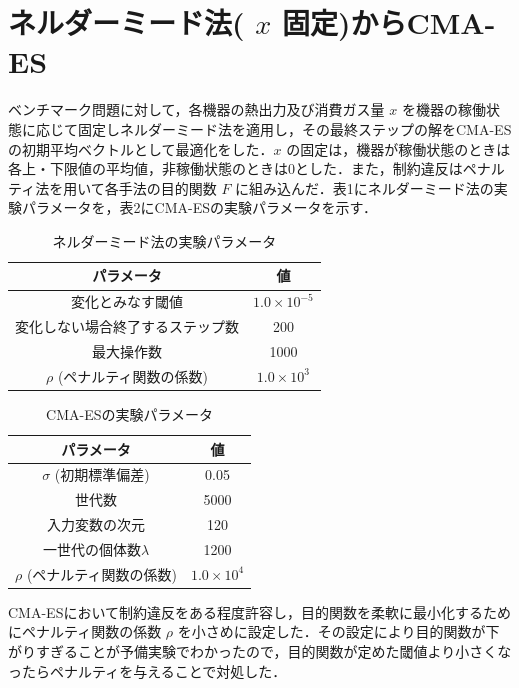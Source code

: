 \documentclass[twocolumn]{jarticle}
\begin{document}
\section{ネルダーミード法( $x$ 固定)からCMA-ES}
    ベンチマーク問題に対して，各機器の熱出力及び消費ガス量 $x$ を機器の稼働状態に応じて固定しネルダーミード法を適用し，その最終ステップの解をCMA-ESの初期平均ベクトルとして最適化をした．$x$ の固定は，機器が稼働状態のときは各上・下限値の平均値，非稼働状態のときは0とした．また，制約違反はペナルティ法を用いて各手法の目的関数 $F$ に組み込んだ．表1にネルダーミード法の実験パラメータを，表2にCMA-ESの実験パラメータを示す．
    \begin{table}[htbp]	%
        \begin{center}
            \caption{ネルダーミード法の実験パラメータ}
            \begin{tabular}{| c | c |} \hline
                パラメータ & 値 \\ \hline
                変化とみなす閾値 & $1.0\times10^{-5}$ \\ 
                変化しない場合終了するステップ数 & 200 \\
                最大操作数 & 1000 \\
                $\rho$ (ペナルティ関数の係数) & $1.0\times10^{3}$\\ \hline
            \end{tabular}
        \end{center}
    \end{table}
    \begin{table}[htbp] %
        \begin{center}
            \caption{CMA-ESの実験パラメータ}
            \begin{tabular}{| c | c |} \hline
                パラメータ & 値 \\ \hline
                $\sigma$ (初期標準偏差) & 0.05 \\
                世代数 & 5000 \\
                入力変数の次元 & 120 \\
                一世代の個体数$\lambda$ & 1200 \\
                $\rho$ (ペナルティ関数の係数) & $1.0\times10^{4}$\\ \hline
            \end{tabular}
        \end{center}
    \end{table}
    CMA-ESにおいて制約違反をある程度許容し，目的関数を柔軟に最小化するためにペナルティ関数の係数 $\rho$ を小さめに設定した．その設定により目的関数が下がりすぎることが予備実験でわかったので，目的関数が定めた閾値より小さくなったらペナルティを与えることで対処した．
    
\end{document}
